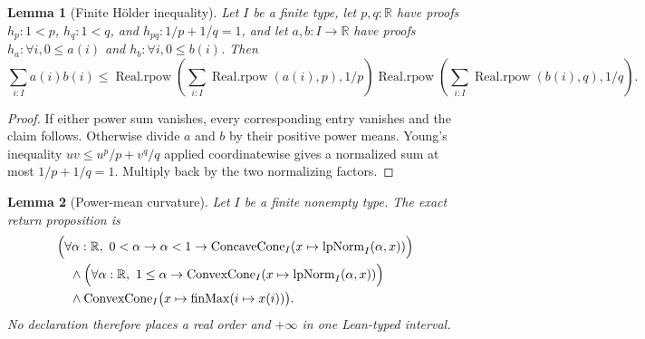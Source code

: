 \documentclass[9pt]{extarticle}
\newtheorem{lemma}{Lemma}[section]
\theoremstyle{definition}
\theoremstyle{remark}
\newcommand{\R}{\mathbb R}
\begin{document}
\begin{lemma}[Finite H\"older inequality]\label{lem:finite-holder}
Let $I$ be a finite type, let $p,q:\R$ have proofs $h_p:1<p$,
$h_q:1<q$, and $h_{pq}:1/p+1/q=1$, and let $a,b:I\to\R$ have proofs
$h_a:\forall i,0\leq a(i)$ and $h_b:\forall i,0\leq b(i)$.  Then
\[
 \sum_{i:I}a(i)b(i)
 \leq
 \operatorname{Real.rpow}\!\left(
   \sum_{i:I}\operatorname{Real.rpow}(a(i),p),1/p\right)
 \operatorname{Real.rpow}\!\left(
   \sum_{i:I}\operatorname{Real.rpow}(b(i),q),1/q\right).
\]
\end{lemma}

\begin{proof}
If either power sum vanishes, every corresponding entry vanishes and the
claim follows.  Otherwise divide $a$ and $b$ by their positive power means.
Young's inequality $uv\leq u^p/p+v^q/q$ applied coordinatewise gives a
normalized sum at most $1/p+1/q=1$.  Multiply back by the two normalizing
factors.
\end{proof}

\begin{lemma}[Power-mean curvature]\label{lem:power-curvature}
Let $I$ be a finite nonempty type.  The exact return proposition is
\begin{align*}
 &\Bigl(\forall\alpha:\R,\ 0<\alpha\to\alpha<1\to
   \operatorname{ConcaveCone}_I
    (x\mapsto\operatorname{lpNorm}_I(\alpha,x))\Bigr)\\
 &\quad\wedge
 \Bigl(\forall\alpha:\R,\ 1\leq\alpha\to
   \operatorname{ConvexCone}_I
    (x\mapsto\operatorname{lpNorm}_I(\alpha,x))\Bigr)\\
 &\quad\wedge
 \operatorname{ConvexCone}_I
  \bigl(x\mapsto\operatorname{finMax}(i\mapsto x(i))\bigr).
\end{align*}
No declaration therefore places a real order and $+\infty$ in one
Lean-typed interval.
\end{lemma}
\end{document}
